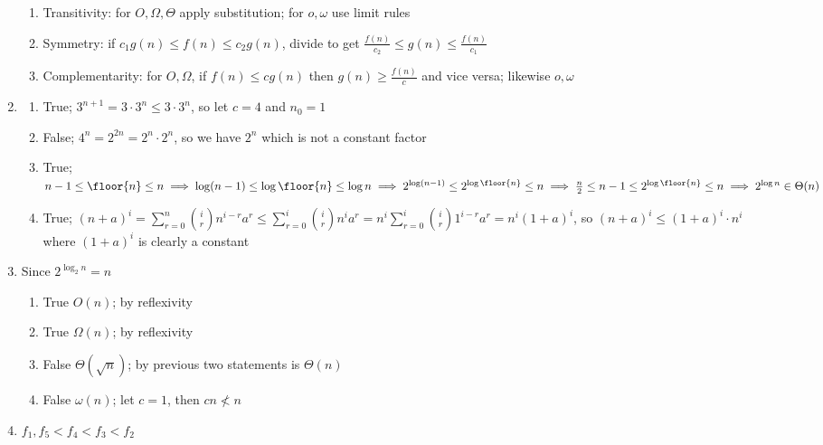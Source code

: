 \documentclass[12pt, a4paper]{article}
\begin{document}
\begin{enumerate}[Q\arabic*).]
\begin{enumerate}[(\alph*)]
      \item Transitivity: for $O, \Omega, \Theta$ apply substitution; for $o, \omega$ use limit rules

      \item Symmetry: if $c_1 g(n) \leq f(n) \leq c_2g(n)$, divide to get $\frac{f(n)}{c_2} \leq g(n) \leq \frac{f(n)}{c_1}$

      \item Complementarity: for $O, \Omega$, if $f(n) \leq cg(n)$ then $g(n) \geq \frac{f(n)}{c}$ and vice versa; likewise $o, \omega$
    \end{enumerate}

  \item 
    \begin{enumerate}[(\alph*.)]
      \item True; $3^{n+1} = 3\cdot 3^n \leq 3 \cdot 3^n$, so let $c=4$ and $n_0=1$
      \item False; $4^n = 2^{2n} = 2^n \cdot 2^n$, so we have $2^n$ which is not a constant factor 
      \item True; $n-1 \leq \floor{n} \leq n \implies \log (n-1) \leq \log \floor{n} \leq \log n \implies 2^{\log (n-1)} \leq 2^{\log \floor{n}} \leq n \implies \frac{n}{2}\leq n-1 \leq 2^{\log \floor{n}} \leq n \implies 2^{\log {n}} \in \Theta(n)$
      \item True; $(n+a)^i = \sum^n_{r=0} \binom ir n^{i-r} a^r \leq \sum^i_{r=0} \binom ir n^i a^r = n^i \sum^i_{r=0} \binom ir 1^{i-r} a^r = n^i(1+a)^i$, so $(n+a)^i \leq (1+a)^i\cdot n^i$ where $(1+a)^i$ is clearly a constant 
    \end{enumerate}

  \item Since $2^{\log_2n} = n$ 
    \begin{enumerate}[(\alph*.)]
      \item True $O(n)$; by reflexivity
      \item True $\Omega(n)$; by reflexivity
      \item False $\Theta(\sqrt n)$; by previous two statements is $\Theta(n)$
      \item False $\omega(n)$; let $c = 1$, then $cn \not < n$
    \end{enumerate}

  \item $f_1, f_5 < f_4 < f_3 < f_2$
\end{enumerate}
\end{document}
